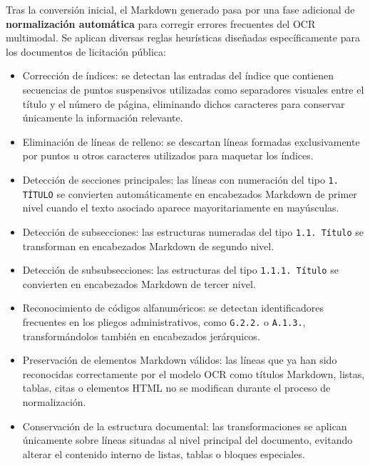 Tras la conversión inicial, el Markdown generado pasa por una fase adicional de \textbf{normalización automática} para corregir errores frecuentes del OCR multimodal. Se aplican diversas reglas heurísticas diseñadas específicamente para los documentos de licitación pública:
\begin{itemize}
	\item Corrección de índices: se detectan las entradas del índice que contienen secuencias de puntos suspensivos utilizadas como separadores visuales entre el título y el número de página, eliminando dichos caracteres para conservar únicamente la información relevante.
	\item Eliminación de líneas de relleno: se descartan líneas formadas exclusivamente por puntos u otros caracteres utilizados para maquetar los índices.
	\item Detección de secciones principales: las líneas con numeración del tipo \texttt{1. TÍTULO} se convierten automáticamente en encabezados Markdown de primer nivel cuando el texto asociado aparece mayoritariamente en mayúsculas.
	\item Detección de subsecciones: las estructuras numeradas del tipo \texttt{1.1. Título} se transforman en encabezados Markdown de segundo nivel.
	\item Detección de subsubsecciones: las estructuras del tipo \texttt{1.1.1. Título} se convierten en encabezados Markdown de tercer nivel.
	\item Reconocimiento de códigos alfanuméricos: se detectan identificadores frecuentes en los pliegos administrativos, como \texttt{G.2.2.} o \texttt{A.1.3.}, transformándolos también en encabezados jerárquicos.
	\item Preservación de elementos Markdown válidos: las líneas que ya han sido reconocidas correctamente por el modelo OCR como títulos Markdown, listas, tablas, citas o elementos HTML no se modifican durante el proceso de normalización.
	\item Conservación de la estructura documental: las transformaciones se aplican únicamente sobre líneas situadas al nivel principal del documento, evitando alterar el contenido interno de listas, tablas o bloques especiales.
\end{itemize}

